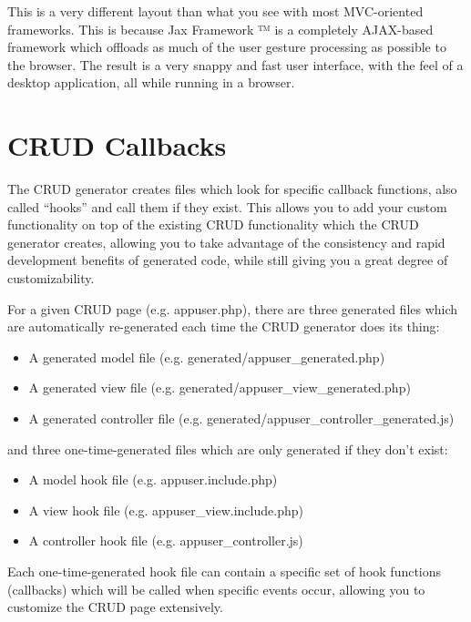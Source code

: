\documentclass[letterpaper,10pt,english]{sphinxmanual}
\begin{document}
This is a very different layout than what you see with most MVC-oriented frameworks.  This is
because Jax Framework ™ is a completely AJAX-based framework which offloads as much of the
user gesture processing as possible to the browser.  The result is a very snappy and fast user
interface, with the feel of a desktop application, all while running in a browser.


\section{CRUD Callbacks}
\label{jaxFrameworkGuide:crud-callbacks}
The CRUD generator creates files which look for specific callback functions, also called ``hooks'' and
call them if they exist.  This allows you to add your custom functionality on top of the existing
CRUD functionality which the CRUD generator creates, allowing you to take advantage of the
consistency and rapid development benefits of generated code, while still giving you a great degree
of customizability.

For a given CRUD page (e.g. appuser.php), there are three generated files which are automatically
re-generated each time the CRUD generator does its thing:
\begin{itemize}
\item {} 
A generated model file (e.g. generated/appuser\_generated.php)

\item {} 
A generated view file (e.g. generated/appuser\_view\_generated.php)

\item {} 
A generated controller file (e.g. generated/appuser\_controller\_generated.js)

\end{itemize}

and three one-time-generated files which are only generated if they don't exist:
\begin{itemize}
\item {} 
A model hook file (e.g. appuser.include.php)

\item {} 
A view hook file (e.g. appuser\_view.include.php)

\item {} 
A controller hook file (e.g. appuser\_controller.js)

\end{itemize}

Each one-time-generated hook file can contain a specific set of hook functions (callbacks) which
will be called when specific events occur, allowing you to customize the CRUD page extensively.
\end{document}
